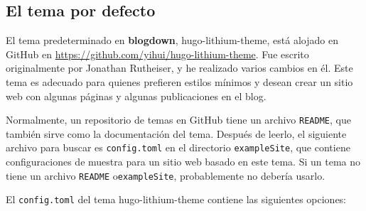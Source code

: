 \documentclass[12pt,]{krantz}
\theoremstyle{definition}
\theoremstyle{definition}
\theoremstyle{definition}
\theoremstyle{remark}
\begin{document}
\hypertarget{el-tema-por-defecto}{%
\subsection{El tema por defecto}\label{el-tema-por-defecto}}

El tema predeterminado en \textbf{blogdown},
hugo-lithium-theme, está alojado en GitHub en
\url{https://github.com/yihui/hugo-lithium-theme}. Fue escrito
originalmente por Jonathan Rutheiser, y he realizado varios cambios en
él. Este tema es adecuado para quienes prefieren estilos mínimos y
desean crear un sitio web con algunas páginas y algunas publicaciones en
el blog.

Normalmente, un repositorio de temas en GitHub tiene un archivo
\texttt{README}, que también sirve como la documentación del tema.
Después de leerlo, el siguiente archivo para buscar es
\texttt{config.toml} en el directorio \texttt{exampleSite}, que contiene
configuraciones de muestra para un sitio web basado en este tema. Si un
tema no tiene un archivo \texttt{README} o\texttt{exampleSite},
probablemente no debería usarlo.

El \texttt{config.toml} del tema hugo-lithium-theme contiene las
siguientes opciones:
\end{document}
